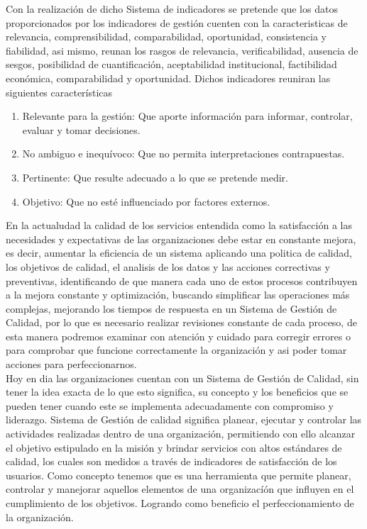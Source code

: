 	Con la realizaci\'on de dicho Sistema de indicadores se pretende que los datos proporcionados por los indicadores de gesti\'on cuenten con la caracteristicas de relevancia, comprensibilidad, comparabilidad, oportunidad, consistencia y fiabilidad, asi mismo, reunan los rasgos de relevancia, verificabilidad, ausencia de sesgos, posibilidad de cuantificaci\'on, aceptabilidad institucional, factibilidad econ\'omica, comparabilidad y oportunidad. Dichos indicadores reuniran las siguientes caracter\'isticas\\

	\begin{enumerate}
		\item  Relevante para la gesti\'on: Que aporte informaci\'on para informar, controlar, evaluar y tomar decisiones.
		\item  No ambiguo e inequ\'ivoco: Que no permita interpretaciones contrapuestas.
		\item  Pertinente: Que resulte adecuado a lo que se pretende medir.
		\item  Objetivo: Que no est\'e influenciado por factores externos.
	\end{enumerate}

	En la actualudad la calidad de los servicios entendida como la satisfacci\'on a las necesidades y expectativas de las organizaciones debe estar en constante mejora, es decir, aumentar la eficiencia de un sistema aplicando una politica de calidad, los objetivos de calidad, el analisis de los datos y las acciones correctivas y preventivas, identificando de que manera cada uno de estos procesos contribuyen a la mejora constante y optimizaci\'on, buscando simplificar las operaciones m\'as complejas, mejorando los tiempos de respuesta en un Sistema de Gesti\'on de Calidad, por lo que es necesario realizar revisiones constante de cada proceso, de esta manera podremos examinar con atenci\'on y cuidado para corregir errores o para comprobar que funcione correctamente la organizaci\'on y asi poder tomar acciones para perfeccionarnos.\\

	Hoy en dia las organizaciones cuentan con un Sistema de Gesti\'on de Calidad, sin tener la idea exacta de lo que esto significa, su concepto y los beneficios que se pueden tener cuando este se implementa adecuadamente con compromiso y liderazgo. Sistema de Gesti\'on de calidad significa planear, ejecutar y controlar las actividades realizadas dentro de una organizaci\'on, permitiendo con ello alcanzar el objetivo estipulado en la misi\'on y brindar servicios con altos est\'andares de calidad, los cuales son medidos a trav\'es de indicadores de satisfacci\'on de los usuarios. Como concepto tenemos que es una herramienta que permite planear, controlar y manejorar aquellos elementos de una organizac\'i\'on que influyen en el cumplimiento de los objetivos. Logrando como beneficio el perfeccionamiento de la organizaci\'on.\\

